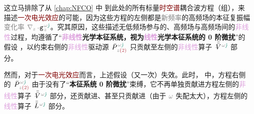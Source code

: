 这立马排除了从 \cref{chap:NFCO} 中  到此处的所有标量\textcolor{Maroon}{时空谱}耦合波方程（组），来描述\textcolor{Maroon}{一次电光效应}的可能，因为这些方程的左侧都是\textcolor{gray}{新频率}的\textcolor{NavyBlue}{高频场}的\textcolor{PineGreen}{本征复振幅}\textcolor{gray}{变化率} $\mathcolor{gray}{\nabla_z} \xint{\begin{smallmatrix} ~ \\ {}^{}_{\mathcolor{gray}{-}} \\ ~ \end{smallmatrix}}{09}{\mathtt{g}}^{\;\!\mathcolor{gray}{\omega} \textcolor{PineGreen}{\hat{\jmath}}}_{\;\! \mathcolor{gray}{z}}$。究其原因，这些描述无\textcolor{NavyBlue}{低频场}参与的、\textcolor{NavyBlue}{高频场}与\textcolor{NavyBlue}{高频场}间的\textcolor{Plum}{非线性}过程，均遵循了“\textbf{\textcolor{Plum}{非线性}\textcolor{NavyBlue}{光学}\textcolor{PineGreen}{本征系统}，视为\textcolor{Plum}{线性}\textcolor{NavyBlue}{光学}\textcolor{PineGreen}{本征系统}的 \textcolor{NavyBlue}{0 阶微扰}}”的假设 ，以约束右侧的\textcolor{Plum}{非线性}\textcolor{NavyBlue}{驱动源} $\xint{\mathcolor{gray}{-}}{25}{\bar{P}}^{\;\! \mathcolor{gray}{\omega} \textcolor{PineGreen}{\hat{\jmath}}}_{\;\! \mathcolor{gray}{z} \textcolor{Maroon}{(2)}}$ 只贡献至左侧的\textcolor{Plum}{非线性}算子 $\xint{\mathcolor{gray}{-}}{21}{\bar{\bar{V}}}^{\;\! \mathcolor{gray}{\omega} \textcolor{PineGreen}{\hat{\jmath}}}$ 部分。

然而，对于\textcolor{Maroon}{一次电光效应}而言，上述假设（又一次）失效。此时， 中，方程右侧的 $\xint{\mathcolor{gray}{-}}{25}{\bar{P}}^{\;\! \mathcolor{gray}{\omega} \textcolor{PineGreen}{\hat{\jmath}}}_{\;\! \mathcolor{gray}{z} \textcolor{Maroon}{(2)}}$ 由于没有了“\textbf{\textcolor{PineGreen}{本征系统} \textcolor{NavyBlue}{0 阶微扰}}”束缚，它不再单独贡献进方程左侧的\textcolor{Plum}{非线性}算子 $\xint{\mathcolor{gray}{-}}{21}{\bar{\bar{V}}}^{\;\! \mathcolor{gray}{\omega} \textcolor{PineGreen}{\hat{\jmath}}}$ 部分，还贡献进、甚至只贡献进（由于 $\textcolor{gray}{\omega}$ 失配太大），方程左侧的\textcolor{Plum}{线性}算子 $\xint{\mathcolor{gray}{-}}{30}{\bar{\bar{L}}}^{\;\! \mathcolor{gray}{\omega} \textcolor{PineGreen}{\hat{\jmath}}}$ 部分。

